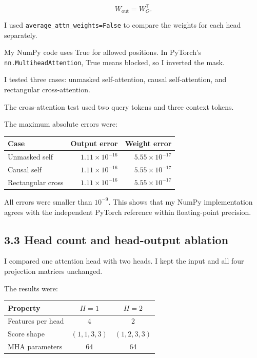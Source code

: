 \documentclass[11pt]{article}
\begin{document}
\[
W_{\mathrm{out}}=W_O^\top.
\]

I used \texttt{average\_attn\_weights=False}
to compare the weights for each head separately.

My NumPy code uses True for allowed positions.
In PyTorch's \texttt{nn.MultiheadAttention},
True means blocked, so I inverted the mask.

I tested three cases:
unmasked self-attention, causal self-attention,
and rectangular cross-attention.

The cross-attention test used two query tokens
and three context tokens.

The maximum absolute errors were:

\begin{center}
\begin{tabular}{lrr}
\toprule
Case & Output error & Weight error \\
\midrule
Unmasked self &
$1.11\times10^{-16}$ &
$5.55\times10^{-17}$ \\
Causal self &
$1.11\times10^{-16}$ &
$5.55\times10^{-17}$ \\
Rectangular cross &
$1.11\times10^{-16}$ &
$5.55\times10^{-17}$ \\
\bottomrule
\end{tabular}
\end{center}

All errors were smaller than $10^{-9}$.
This shows that my NumPy implementation
agrees with the independent PyTorch reference
within floating-point precision.
\subsection*{3.3 Head count and head-output ablation}
I compared one attention head with two heads.
I kept the input and all four projection
matrices unchanged.

The results were:

\begin{center}
\begin{tabular}{lcc}
\toprule
Property & $H=1$ & $H=2$ \\
\midrule
Features per head & 4 & 2 \\
Score shape & $(1,1,3,3)$ & $(1,2,3,3)$ \\
MHA parameters & 64 & 64 \\
\bottomrule
\end{tabular}
\end{center}
\end{document}
